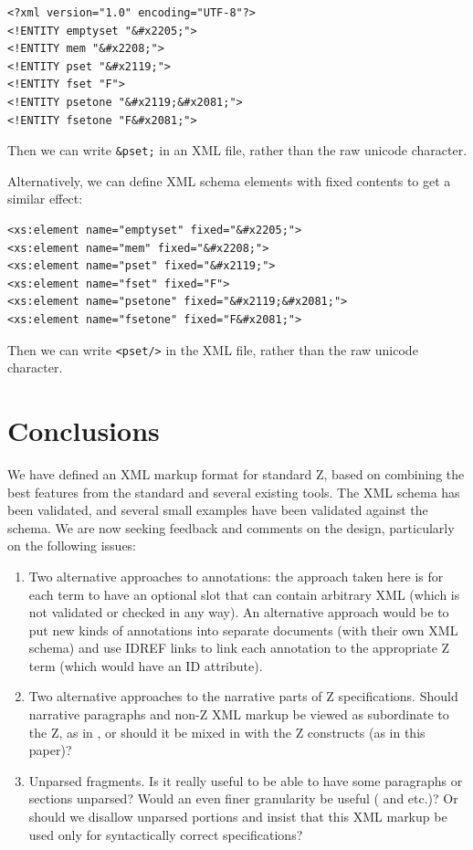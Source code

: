 \documentclass{llncs}  %
\begin{document}
\begin{small}
\begin{verbatim} 
<?xml version="1.0" encoding="UTF-8"?>
<!ENTITY emptyset "&#x2205;">
<!ENTITY mem "&#x2208;">
<!ENTITY pset "&#x2119;">
<!ENTITY fset "F">
<!ENTITY psetone "&#x2119;&#x2081;">
<!ENTITY fsetone "F&#x2081;">
\end{verbatim}
\end{small}

Then we can write \verb!&pset;! in an XML file, rather than
the raw unicode character.

Alternatively, we can define XML schema elements with fixed contents
to get a similar effect:
\begin{small}
\begin{verbatim} 
<xs:element name="emptyset" fixed="&#x2205;">
<xs:element name="mem" fixed="&#x2208;">
<xs:element name="pset" fixed="&#x2119;">
<xs:element name="fset" fixed="F">
<xs:element name="psetone" fixed="&#x2119;&#x2081;">
<xs:element name="fsetone" fixed="F&#x2081;">
\end{verbatim}
\end{small}

Then we can write \verb!<pset/>! in the XML file, rather than
the raw unicode character.


\section{Conclusions}

We have defined an XML markup format for standard Z, based on
combining the best features from the standard and several existing 
tools.  The XML schema has been validated, and several small examples
have been validated against the schema.  We are now seeking feedback 
and comments on the design, particularly on the following issues:
\begin{enumerate}
\item Two alternative approaches to annotations: the approach taken
  here is for each term to have an optional  slot that can
  contain arbitrary XML (which is not validated or checked in any way).  
  An alternative approach would be to put new kinds of annotations into
  separate documents (with their own XML schema) and use IDREF links
  to link each annotation to the appropriate Z term (which would have an ID
  attribute).  
\item Two alternative approaches to the narrative parts of Z
  specifications.  Should narrative paragraphs and non-Z XML markup be
  viewed as subordinate to the Z, as in \CADiZ, or should it be mixed in
  with the Z constructs (as in this paper)?
\item Unparsed fragments.  Is it really useful to be able to have some
  paragraphs or sections unparsed?  Would an even finer granularity be
  useful ( and  etc.)?  Or should we disallow
  unparsed portions and insist that this XML markup be used only for
  syntactically correct specifications? 
\end{enumerate}
\end{document}
